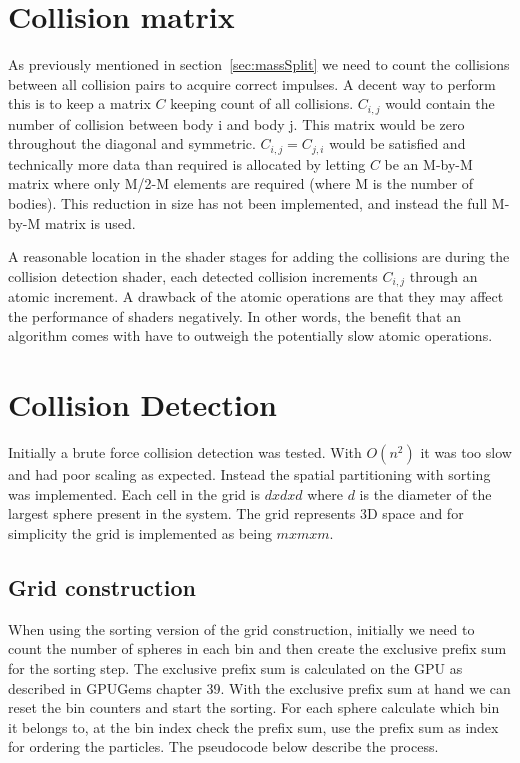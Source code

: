 \section{Collision matrix}\label{sec:colMatrix}
As previously mentioned in section~\ref{sec:massSplit} we need to count the collisions
between all collision pairs to acquire correct impulses. A decent way to perform
this is to keep a matrix $C$ keeping count of all collisions. $C_{i,j}$ would
contain the number of collision between body i and body j. This matrix would be
zero throughout the diagonal and symmetric. $C_{i,j} = C_{j,i}$ would
be satisfied and technically more data than required is allocated by letting $C$
be an M-by-M matrix where only M/2-M elements are required (where M is the
number of bodies). This reduction in size
has not been implemented, and instead the full M-by-M matrix is used.

A reasonable location in the shader stages for adding the collisions are during
the collision detection shader, each detected collision increments $C_{i,j}$
 through an atomic increment. A drawback of the atomic
 operations are that they may affect the performance of shaders negatively. In
 other words, the benefit that an algorithm comes with have to outweigh the potentially
 slow atomic operations.

\section{Collision Detection} \label{sec:implcd}
\reversemarginpar
{}
Initially a brute force collision detection was tested. With $O(n^2)$ it was too
slow and had poor scaling as expected. Instead the spatial partitioning with sorting
was implemented.
Each cell in the grid is $d x d x d$ where $d$ is the diameter of the largest sphere
present in the system. The grid represents 3D space and for simplicity the grid is
implemented as being $mxmxm$.

\subsection{Grid construction}
When using the sorting version of the grid construction, initially we need to count
the number of spheres in each bin and then create the exclusive prefix sum for the sorting
step. The exclusive prefix sum is calculated on the GPU as described in GPUGems chapter 39.
With the exclusive prefix sum at hand we can reset the bin counters and start the sorting.
For each sphere calculate which bin it belongs to, at the bin index check the prefix sum,
use the prefix sum as index for ordering the particles. The pseudocode below describe
the process.

